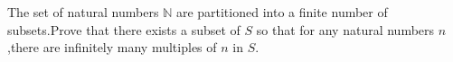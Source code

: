 The set of natural numbers $\mathbb{N}$ are partitioned into a finite number of subsets.Prove that there exists a subset of $S$ so that for any natural numbers $n$,there are infinitely many multiples of $n$ in $S$.